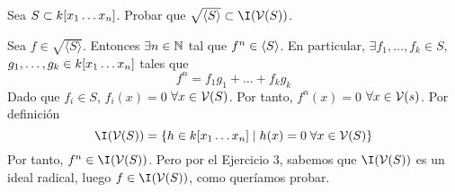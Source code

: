 \documentclass[twoside]{article}
\begin{document}
\newpage 
\begin{ejercicio}{4}
Sea $S\subset k[x_1\dotsc x_{n}]$. Probar que $\sqrt{\langle{S}\rangle}\subset \I(\V(S))$.
\begin{solucion}
Sea $f\in \sqrt{\langle{S}\rangle}$. Entonces $\exists n \in \mathbb{N}$ tal que $f^n \in \langle{S}\rangle$. En particular, $\exists f_1,\dotsc,f_k\in S$, $g_1,\dotsc,g_k \in k[x_1\dotsc x_{n}]$ tales que
$$
f^n = f_1 g_1 + \dotsc + f_k g_k 
$$
Dado que $f_i\in S$, $f_i(x)=0$ $\forall x \in \mathcal{V}(S)$. Por tanto, $f^n(x) = 0$ $\forall x \in \mathcal{V}(s)$. Por definición
$$
\I(\V(S)) =  \{ h \in k[\xn{n}] \mid h(x)=0 \; \forall x\in \V(S)\}
$$
Por tanto, $f^n \in \I(\V(S))$. Pero por el Ejercicio 3, sabemos que $\I(\V(S))$ es un ideal radical, luego $f\in \I(\V(S))$, como queríamos probar.
\end{solucion}
\end{ejercicio}	
\end{document}
